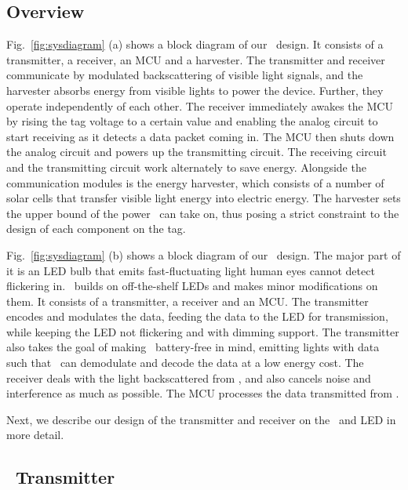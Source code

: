 \subsection{Overview}
Fig.~\ref{fig:sysdiagram} (a) shows a block diagram of our \vitag\ design. It consists of a transmitter, a receiver, an MCU and a harvester. The transmitter and receiver communicate by modulated backscattering of visible light signals, and the harvester absorbs energy from visible lights to power the device. Further, they operate independently of each other. The receiver immediately awakes the MCU by rising the tag voltage to a certain value and enabling the analog circuit to start receiving as it detects a data packet coming in. The MCU then shuts down the analog circuit and powers up the transmitting circuit. The receiving circuit and the transmitting circuit work alternately to save energy. Alongside the communication modules is the energy harvester, which consists of a number of solar cells that transfer visible light energy into electric energy. The harvester sets the upper bound of the power \vitag\ can take on, thus posing a strict constraint to the design of each component on the tag.

Fig.~\ref{fig:sysdiagram} (b) shows a block diagram of our \reader\ design. The major part of it is an LED bulb that emits fast-fluctuating light human eyes cannot detect flickering in. \reader\ builds on off-the-shelf LEDs and makes minor modifications on them. It consists of a transmitter, a receiver and an MCU. The transmitter encodes and modulates the data, feeding the data to the LED for transmission, while keeping the LED not flickering and with dimming support. The transmitter also takes the goal of making \vitag\ battery-free in mind, emitting lights with data such that \vitag\ can demodulate and decode the data at a low energy cost. The receiver deals with the light backscattered from \vitag, and also cancels noise and interference as much as possible. The MCU processes the data transmitted from \vitag.

Next, we describe our design of the transmitter and receiver on the \vitag\ and LED in more detail.





\subsection{\reader\ Transmitter}

